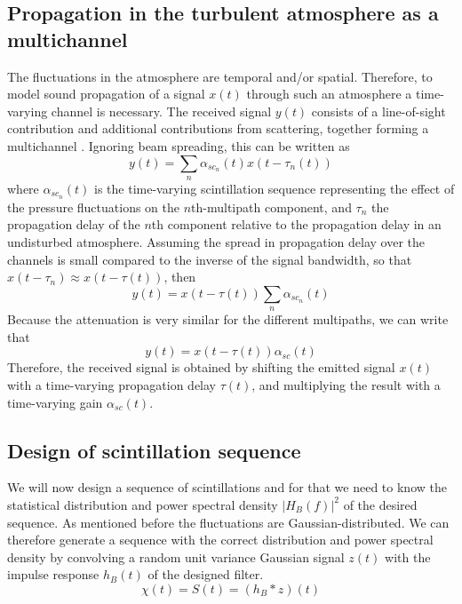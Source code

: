 \subsection{Propagation in the turbulent atmosphere as a multichannel}
The fluctuations in the atmosphere are temporal and/or spatial. Therefore, to
model sound propagation of a signal $x(t)$ through such an atmosphere a
time-varying channel is necessary. The received signal $y(t)$ consists of a
line-of-sight contribution and additional contributions from scattering,
together forming a multichannel \cite{Jurado-navas2006}.
Ignoring beam spreading, this can be written as %
\begin{equation}
 y(t) = \sum_{n} \alpha_{sc_{n}}(t) x(t-\tau_n(t))
\end{equation}
where $\alpha_{sc_{n}}(t)$ is the time-varying scintillation sequence
representing the effect of the pressure fluctuations on the $n$th-multipath
component, and $\tau_n$ the propagation delay of the $n$th component relative to the propagation delay in an undisturbed atmosphere.
Assuming the spread in propagation delay over the channels is small compared to the inverse of the signal bandwidth, so that $x(t-\tau_n) \approx x(t - \tau(t))$, then
\begin{equation}
 y(t) = x(t - \tau(t)) \sum_n \alpha_{sc_{n}}(t)
\end{equation}
Because the attenuation is very similar for the different multipaths, we can write that
\begin{equation}\label{eq:generating_sequences_multiplicative}
 y(t) = x(t - \tau(t)) \alpha_{sc}(t)
\end{equation}
Therefore, the received signal is obtained by shifting the emitted signal $x(t)$ with a time-varying propagation delay $\tau(t)$, and multiplying the result with a time-varying gain $\alpha_{sc}(t)$.


\subsection{Design of scintillation sequence}
We will now design a sequence of scintillations and for that we need to know the
statistical distribution and power spectral density $|H_B(f)|^2$ of the desired
sequence. As mentioned before the fluctuations are Gaussian-distributed. We can
therefore generate a sequence with the correct distribution and power spectral
density by convolving a random unit variance Gaussian signal $z(t)$ with the
impulse response $h_B(t)$ of the designed filter.
\begin{equation}
 \chi(t) = S(t) = (h_B \ast z)(t)
\end{equation}

